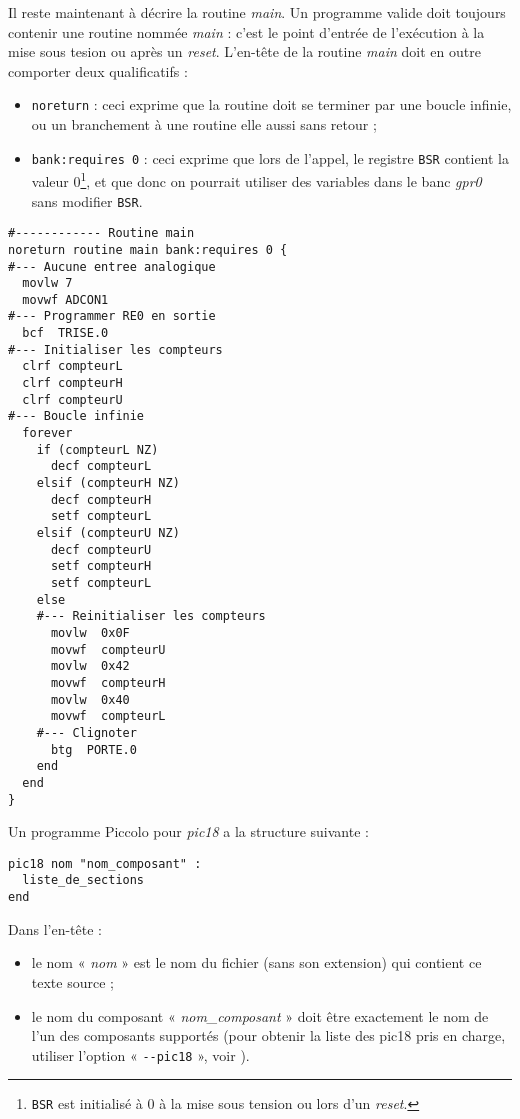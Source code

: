 Il reste maintenant à décrire la routine \emph{main}. Un programme valide doit toujours contenir une routine nommée \emph{main} : c'est le point d'entrée de l'exécution à la mise sous tesion ou après un \emph{reset}. L'en-tête de la routine \emph{main} doit en outre comporter deux qualificatifs :
\begin{itemize}
  \item \texttt{noreturn} : ceci exprime que la routine doit se terminer par une boucle infinie, ou un branchement à une routine elle aussi sans retour ;
  \item \texttt{bank:requires 0} : ceci exprime que lors de l'appel, le registre \texttt{BSR} contient la valeur 0\footnote{\texttt{BSR} est initialisé à 0 à la mise sous tension ou lors d'un \emph{reset}.}, et que donc on pourrait utiliser des variables dans le banc \emph{gpr0} sans modifier \texttt{BSR}.
\end{itemize}

\begin{lstlisting}[language=piccolo]
#------------ Routine main
noreturn routine main bank:requires 0 {
#--- Aucune entree analogique
  movlw 7
  movwf ADCON1
#--- Programmer RE0 en sortie
  bcf  TRISE.0
#--- Initialiser les compteurs
  clrf compteurL
  clrf compteurH
  clrf compteurU
#--- Boucle infinie
  forever
    if (compteurL NZ)
      decf compteurL
    elsif (compteurH NZ)
      decf compteurH
      setf compteurL
    elsif (compteurU NZ)
      decf compteurU
      setf compteurH
      setf compteurL
    else
    #--- Reinitialiser les compteurs
      movlw  0x0F
      movwf  compteurU
      movlw  0x42
      movwf  compteurH
      movlw  0x40
      movwf  compteurL
    #--- Clignoter
      btg  PORTE.0
    end
  end
}
\end{lstlisting}









Un programme Piccolo pour \emph{pic18} a la structure suivante :

\begin{lstlisting}[language=piccolo]
pic18 nom "nom_composant" :
  liste_de_sections
end
\end{lstlisting}


Dans l’en-tête :
\begin{itemize}
  \item le nom « \emph{nom} » est le nom du fichier (sans son extension) qui contient ce texte source ;
  \item le nom du composant « \emph{nom\_composant} » doit être exactement le nom de l’un des composants supportés (pour obtenir la liste des pic18 pris en charge, utiliser l’option « \texttt{-{}-pic18} », voir ).
\end{itemize}


